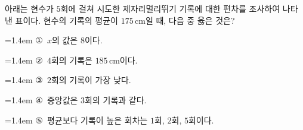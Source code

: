 아래는 현수가 $5$회에 걸쳐 시도한 제자리멀리뛰기 기록에 대한 편차를 조사하여 나타낸 표이다. 현수의 기록의 평균이 $175\,\mathrm{cm}$일 때, 다음 중 옳은 것은?
\par\smallskip\begin{center}\resizebox{\ifdim\width>\linewidth\linewidth\else\width\fi}{!}{}\end{center}
\par\medskip\par\noindent\hangindent=1.4em {\small ①}\ $x$의 값은 $8$이다.\par\noindent\hangindent=1.4em {\small ②}\ $4$회의 기록은 $185\,\mathrm{cm}$이다.\par\noindent\hangindent=1.4em {\small ③}\ $2$회의 기록이 가장 낮다.\par\noindent\hangindent=1.4em {\small ④}\ 중앙값은 $3$회의 기록과 같다.\par\noindent\hangindent=1.4em {\small ⑤}\ 평균보다 기록이 높은 회차는 $1$회, $2$회, $5$회이다.\par\medskip
